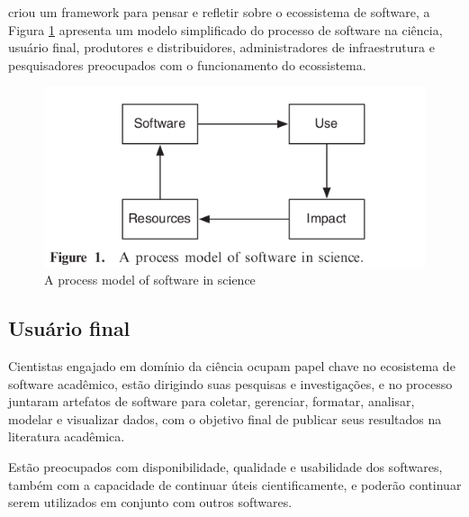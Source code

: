  criou um framework para pensar e refletir
sobre o ecossistema de software, a Figura
\ref{process-model-scientific-software} apresenta um modelo simplificado do
processo de software na ciência, usuário final, produtores e distribuidores,
administradores de infraestrutura e pesquisadores preocupados com o
funcionamento do ecossistema.

\begin{figure}[h]
  \center
  \includegraphics[scale=0.5]{imagens/process-model-scientific-software.png}
  \caption{A process model of software in science \cite{howison2015understanding}}
  \label{process-model-scientific-software}
\end{figure}

%

\subsection{Usuário final}

Cientistas engajado em domínio da ciência ocupam papel chave no ecosistema de
software acadêmico, estão dirigindo suas pesquisas e investigações, e no
processo juntaram artefatos de software para coletar, gerenciar, formatar,
analisar, modelar e visualizar dados, com o objetivo final de publicar seus
resultados na literatura acadêmica.

Estão preocupados com disponibilidade, qualidade e usabilidade dos softwares,
também com a capacidade de continuar úteis cientificamente, e poderão continuar
serem utilizados em conjunto com outros softwares.

